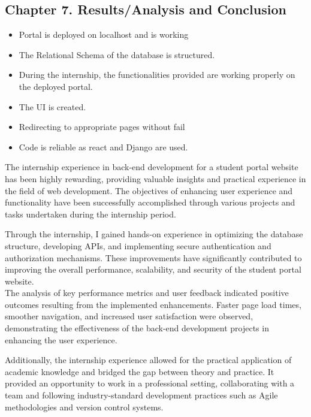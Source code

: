 \documentclass[12pt]{article}
\begin{document}
\pagebreak \newpage
\begin{center}\section*{\Large {Chapter 7. Results/Analysis and Conclusion}}\end{center}

\begin{itemize}
         \item Portal is deployed on localhost and is working  
         \item The Relational Schema of the database is structured. 
         \item During the internship, the functionalities provided are working properly on the deployed portal. 
         \item The UI is created. 
         \item Redirecting to appropriate pages without fail
         \item Code is reliable as react and Django are used. 
\end{itemize}


\medskip
\vspace{1cm}
\hspace{1cm}The internship experience in back-end development for a student portal website has been highly rewarding, providing valuable insights and practical experience in the field of web development. The objectives of enhancing user experience and functionality have been successfully accomplished through various projects and tasks undertaken during the internship period.

Through the internship, I gained hands-on experience in optimizing the database structure, developing APIs, and implementing secure authentication and authorization mechanisms. These improvements have significantly contributed to improving the overall performance, scalability, and security of the student portal website.\\
The analysis of key performance metrics and user feedback indicated positive outcomes resulting from the implemented enhancements. Faster page load times, smoother navigation, and increased user satisfaction were observed, demonstrating the effectiveness of the back-end development projects in enhancing the user experience.\\ \smallskip

\hspace{1cm}Additionally, the internship experience allowed for the practical application of academic knowledge and bridged the gap between theory and practice. It provided an opportunity to work in a professional setting, collaborating with a team and following industry-standard development practices such as Agile methodologies and version control systems.\\ \smallskip
\end{document}

